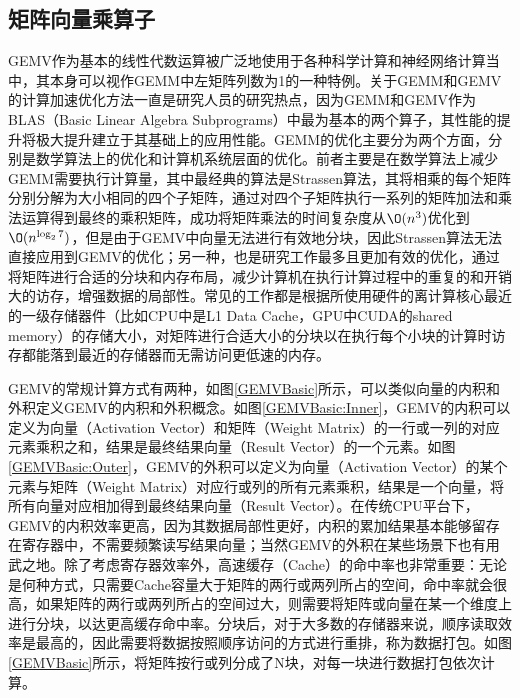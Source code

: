 \subsection{矩阵向量乘算子}
GEMV作为基本的线性代数运算被广泛地使用于各种科学计算和神经网络计算当中，其本身可以视作GEMM中左矩阵列数为1的一种特例。关于GEMM和GEMV的计算加速优化方法一直是研究人员的研究热点，因为GEMM和GEMV作为BLAS（Basic Linear Algebra Subprograms）中最为基本的两个算子，其性能的提升将极大提升建立于其基础上的应用性能。GEMM的优化主要分为两个方面，分别是数学算法上的优化和计算机系统层面的优化。前者主要是在数学算法上减少GEMM需要执行计算量，其中最经典的算法是Strassen算法\cite{Strassen}，其将相乘的每个矩阵分别分解为大小相同的四个子矩阵，通过对四个子矩阵执行一系列的矩阵加法和乘法运算得到最终的乘积矩阵，成功将矩阵乘法的时间复杂度从$\O(n^3)$优化到$\O(n^{\log_{2}7})$，但是由于GEMV中向量无法进行有效地分块，因此Strassen算法无法直接应用到GEMV的优化；另一种，也是研究工作最多且更加有效的优化，通过将矩阵进行合适的分块和内存布局，减少计算机在执行计算过程中的重复的和开销大的访存，增强数据的局部性。常见的工作都是根据所使用硬件的离计算核心最近的一级存储器件（比如CPU中是L1 Data Cache，GPU中CUDA的shared memory\cite{Cuda}）的存储大小，对矩阵进行合适大小的分块以在执行每个小块的计算时访存都能落到最近的存储器而无需访问更低速的内存。

GEMV的常规计算方式有两种，如图\ref{GEMVBasic}所示，可以类似向量的内积和外积定义GEMV的内积和外积概念。如图\ref{GEMVBasic:Inner}，GEMV的内积可以定义为向量（Activation Vector）和矩阵（Weight Matrix）的一行或一列的对应元素乘积之和，结果是最终结果向量（Result Vector）的一个元素。如图\ref{GEMVBasic:Outer}，GEMV的外积可以定义为向量（Activation Vector）的某个元素与矩阵（Weight Matrix）对应行或列的所有元素乘积，结果是一个向量，将所有向量对应相加得到最终结果向量（Result Vector）。在传统CPU平台下，GEMV的内积效率更高，因为其数据局部性更好，内积的累加结果基本能够留存在寄存器中，不需要频繁读写结果向量；当然GEMV的外积在某些场景下也有用武之地。除了考虑寄存器效率外，高速缓存（Cache）的命中率也非常重要：无论是何种方式，只需要Cache容量大于矩阵的两行或两列所占的空间，命中率就会很高，如果矩阵的两行或两列所占的空间过大，则需要将矩阵或向量在某一个维度上进行分块，以达更高缓存命中率。分块后，对于大多数的存储器来说，顺序读取效率是最高的，因此需要将数据按照顺序访问的方式进行重排，称为数据打包。如图\ref{GEMVBasic}所示，将矩阵按行或列分成了N块，对每一块进行数据打包依次计算。

